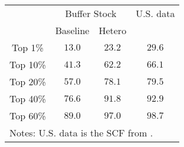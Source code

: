 \begin{center}
\begin{tabular}{l|c|c|c}
\hline
& \multicolumn{2}{|c|}{Buffer Stock} & U.S.
data \\ \cline{2-3}
& Baseline & Hetero \\ \hline
\multicolumn{1}{c|}{Top 1\%}     & $ 13.0$ & $ 23.2$ & $29.6$ \\
\multicolumn{1}{c|}{Top 10\%}    & $ 41.3$ & $ 62.2$ & $66.1$ \\
\multicolumn{1}{c|}{Top 20\%}    & $ 57.0$ & $ 78.1$ & $79.5$ \\
\multicolumn{1}{c|}{Top 40\%}    & $ 76.6$ & $ 91.8$ & $92.9$ \\
\multicolumn{1}{c|}{Top 60\%}    & $ 89.0$ & $ 97.0$ & $98.7$  \\ \hline
\multicolumn{4}{l}{\tiny Notes: U.S. data is the SCF from \text{\citet{castaneda}}.}
\end{tabular}
\end{center}



